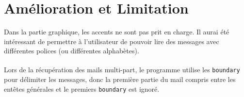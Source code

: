 \documentclass[a4paper, titlepage, oneside, 12pt]{article}%
\begin{document}
\section{Amélioration et Limitation}
\paragraph{}
Dans la partie graphique, les accents ne sont pas prit en charge. Il aurai été intéressant de permettre à l'utilisateur de pouvoir lire des messages avec différentes polices (ou différentes alphabètes). 
\paragraph{}
Lors de la récupération des mails multi-part, le programme utilise les \texttt{boundary} pour délimiter les messages, donc la première partie du mail compris entre les entêtes générales et le premiers \texttt{boundary} est ignoré. 
\end{document}
